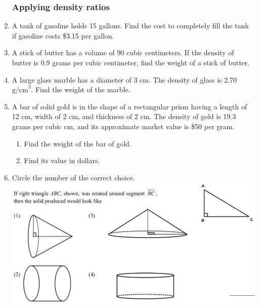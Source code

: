 \documentclass[12pt, twoside]{article}
\begin{document}
\begin{enumerate}
  \newpage
  \subsubsection*{Applying density ratios}
  \item A tank of gasoline holds 15 gallons. Find the cost to completely fill the tank if gasoline costs \$3.15 per gallon. \vspace{3cm}
  \item A stick of butter has a volume of 90 cubic centimeters. If the density of butter is 0.9 grams per cubic centimeter, find the weight of a stick of butter. \vspace{3cm}
  \item A large glass marble has a diameter of 3 cm. The density of glass is 2.70 $\mathrm{g/cm}^3$. Find the weight of the marble. \vspace{3cm}

  \item A bar of solid gold is in the shape of a rectangular prism having a length of 12 cm, width of 2 cm, and thickness of 2 cm. The density of gold is 19.3 grams per cubic cm, and its approximate market value is \$50 per gram.
  \begin{enumerate}
    \item Find the weight of the bar of gold.  \vspace{3cm}
    \item Find its value in dollars.
  \end{enumerate}

\newpage
  \item Circle the number of the correct choice. \\
    \includegraphics[scale=0.42]{triangle-rotation.png}


\end{enumerate}
\end{document}
